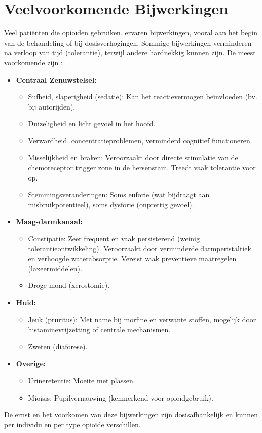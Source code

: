 \documentclass[11pt, a4paper]{report} %
\begin{document}
\section{Veelvoorkomende Bijwerkingen}
Veel patiënten die opioïden gebruiken, ervaren bijwerkingen, vooral aan het begin van de behandeling of bij dosisverhogingen. Sommige bijwerkingen verminderen na verloop van tijd (tolerantie), terwijl andere hardnekkig kunnen zijn. De meest voorkomende zijn \parencite{ClevelandClinicOpioids, Gupta2010ChemistryOpioids}:
\begin{itemize}
    \item \textbf{Centraal Zenuwstelsel:}
        \begin{itemize}
            \item Sufheid, slaperigheid (sedatie): Kan het reactievermogen beïnvloeden (bv. bij autorijden).
            \item Duizeligheid en licht gevoel in het hoofd.
            \item Verwardheid, concentratieproblemen, verminderd cognitief functioneren.
            \item Misselijkheid en braken: Veroorzaakt door directe stimulatie van de chemoreceptor trigger zone in de hersenstam. Treedt vaak tolerantie voor op.
            \item Stemmingsveranderingen: Soms euforie (wat bijdraagt aan misbruikpotentieel), soms dysforie (onprettig gevoel).
        \end{itemize}
    \item \textbf{Maag-darmkanaal:}
        \begin{itemize}
            \item Constipatie: Zeer frequent en vaak persisterend (weinig tolerantieontwikkeling). Veroorzaakt door verminderde darmperistaltiek en verhoogde waterabsorptie. Vereist vaak preventieve maatregelen (laxeermiddelen).
            \item Droge mond (xerostomie).
        \end{itemize}
    \item \textbf{Huid:}
        \begin{itemize}
            \item Jeuk (pruritus): Met name bij morfine en verwante stoffen, mogelijk door histaminevrijzetting of centrale mechanismen.
            \item Zweten (diaforese).
        \end{itemize}
    \item \textbf{Overige:}
        \begin{itemize}
            \item Urineretentie: Moeite met plassen.
            \item Mioisis: Pupilvernauwing (kenmerkend voor opioïdgebruik).
        \end{itemize}
\end{itemize}
De ernst en het voorkomen van deze bijwerkingen zijn dosisafhankelijk en kunnen per individu en per type opioïde verschillen.
\end{document}
